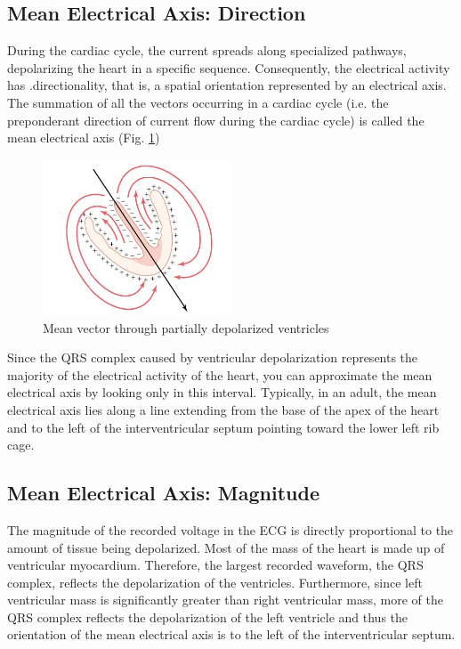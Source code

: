 \documentclass{article}
\begin{document}
\subsection*{Mean Electrical Axis: Direction}
During the cardiac cycle, the current spreads along specialized pathways, depolarizing the heart in a specific sequence. Consequently, the electrical activity has .directionality, that is, a spatial orientation represented by an electrical axis. The summation of all the vectors occurring in a cardiac cycle (i.e. the preponderant direction of current flow during the cardiac cycle) is called the mean electrical axis (Fig. \ref{axis})

\begin{figure}[h]
\centering\includegraphics[width=0.5\textwidth]{../images/ECG_II_2.jpg}
\caption{Mean vector through partially depolarized ventricles}
\label{axis}
\end{figure}

Since the QRS complex caused by ventricular depolarization represents the majority of the electrical activity of the heart, you can approximate the mean electrical axis by looking only in this interval. Typically, in an adult, the mean electrical axis lies along a line extending from the base of the apex of the heart and to the left of the interventricular septum pointing toward the lower left rib cage.

\subsection*{Mean Electrical Axis: Magnitude}
The magnitude of the recorded voltage in the ECG is directly proportional to the amount of tissue being depolarized. Most of the mass of the heart is made up of ventricular myocardium. Therefore, the largest recorded waveform, the QRS complex, reflects the depolarization of the ventricles. Furthermore, since left ventricular mass is significantly greater than right ventricular mass, more of the QRS complex reflects the depolarization of the left ventricle and thus the orientation of the mean electrical axis is to the left of the interventricular septum.
\end{document}
